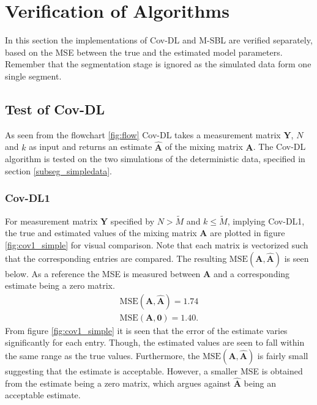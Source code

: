 \section{Verification of Algorithms}
In this section the implementations of Cov-DL and M-SBL are verified separately, based on the MSE between the true and the estimated model parameters.
Remember that the segmentation stage is ignored as the simulated data form one single segment.    

\subsection{Test of Cov-DL}
As seen from the flowchart \ref{fig:flow} Cov-DL takes a measurement matrix $\mathbf{Y}$, $N$ and $k$ as input and returns an estimate $\hat{\mathbf{A}}$ of the mixing matrix $\mathbf{A}$. 
The Cov-DL algorithm is tested on the two simulations of the deterministic data, specified in section \ref{subseg_simpledata}. 

\subsubsection{Cov-DL1}
For measurement matrix $\mathbf{Y}$ specified by $N > \widetilde{M}$ and $k \leq \widetilde{M}$, implying Cov-DL1, the true and estimated values of the mixing matrix $\mathbf{A}$ are plotted in figure \ref{fig:cov1_simple} for visual comparison. 
Note that each matrix is vectorized such that the corresponding entries are compared.  
The resulting $\text{MSE}(\mathbf{A}, \hat{\mathbf{A}})$ is seen below. 
As a reference the MSE is measured between $\mathbf{A}$ and a corresponding estimate being a zero matrix.   
\begin{align*}
\text{MSE}(\mathbf{A}, \hat{\mathbf{A}}) = 1.74 \\
\text{MSE}(\mathbf{A}, \mathbf{0}) = 1.40.
\end{align*}
From figure \ref{fig:cov1_simple} it is seen that the error of the estimate varies significantly for each entry. 
Though, the estimated values are seen to fall within the same range as the true values.
Furthermore, the $\text{MSE}(\mathbf{A}, \hat{\mathbf{A}})$ is fairly small suggesting that the estimate is acceptable. However, a smaller MSE is obtained from the estimate being a zero matrix, which argues against $\hat{\mathbf{A}}$ being an acceptable estimate. 

